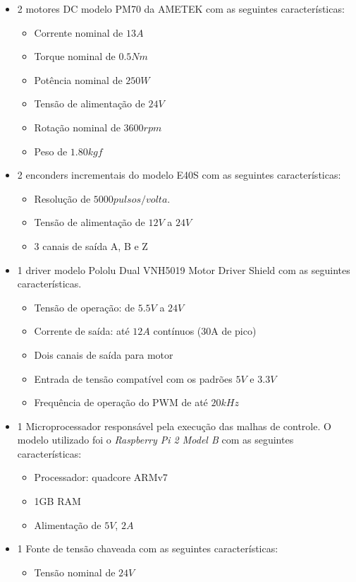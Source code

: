 \documentclass[]{politex}
\begin{document}
\begin{itemize}
\item 2 motores DC modelo PM70 da AMETEK com as seguintes características:
\begin{itemize}
\item Corrente nominal de $13A$ 
\item Torque nominal de $0.5Nm$
\item Potência nominal de $250W$
\item Tensão de alimentação de $24V$
\item Rotação nominal de $3600 rpm$
\item Peso de $1.80 kgf$ 
\end{itemize}
\item  2 enconders incrementais do modelo E40S com as seguintes características:
\begin{itemize}
\item Resolução de $5000 pulsos/volta$.
\item Tensão de alimentação de $12V$ a $24V$
\item 3 canais de saída A, B e Z
\end{itemize}
\item 1 driver modelo Pololu Dual VNH5019 Motor Driver Shield com as seguintes características.
\begin{itemize}
\item Tensão de operação: de $5.5V$ a $24V$
\item Corrente de saída: até $12A$ contínuos (30A de pico)
\item Dois canais de saída para motor
\item Entrada de tensão compatível com os padrões $5V$ e $3.3V$
\item Frequência de operação do PWM de até $20kHz$
\end{itemize}
\item 1 Microprocessador responsável pela execução das malhas de controle. O modelo utilizado foi o \textit{Raspberry Pi 2 Model B} com as seguintes características:
\begin{itemize}
\item Processador: quadcore ARMv7
\item 1GB RAM
\item Alimentação de $5V$, $2A$
\end{itemize}
\item 1 Fonte de tensão chaveada com as seguintes características:
\begin{itemize}
\item Tensão nominal de $24V$

\end{itemize}
\end{itemize}
\end{document}
